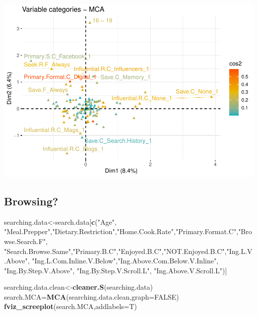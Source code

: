\documentclass[
]{article}
\newenvironment{Shaded}{\begin{snugshade}}{\end{snugshade}}
\newcommand{\DataTypeTok}[1]{\textcolor[rgb]{0.13,0.29,0.53}{#1}}
\newcommand{\KeywordTok}[1]{\textcolor[rgb]{0.13,0.29,0.53}{\textbf{#1}}}
\newcommand{\NormalTok}[1]{#1}
\newcommand{\OtherTok}[1]{\textcolor[rgb]{0.56,0.35,0.01}{#1}}
\newcommand{\StringTok}[1]{\textcolor[rgb]{0.31,0.60,0.02}{#1}}
\begin{document}
\includegraphics{Average-User-MCA_files/figure-latex/mca searching all-3.pdf}

\hypertarget{browsing}{%
\subsection{Browsing?}\label{browsing}}

\begin{Shaded}
\begin{Highlighting}[]
\NormalTok{searching.data<-search.data[}\KeywordTok{c}\NormalTok{(}\StringTok{"Age"}\NormalTok{, }\StringTok{"Meal.Prepper"}\NormalTok{,}\StringTok{"Dietary.Restriction"}\NormalTok{,}\StringTok{"Home.Cook.Rate"}\NormalTok{,}\StringTok{"Primary.Format.C"}\NormalTok{,}\StringTok{"Browse.Search.F"}\NormalTok{,}
            \StringTok{"Search.Browse.Same"}\NormalTok{,}\StringTok{"Primary.B.C"}\NormalTok{,}\StringTok{"Enjoyed.B.C"}\NormalTok{,}\StringTok{"NOT.Enjoyed.B.C"}\NormalTok{,}\StringTok{"Ing.L.V.Above"}\NormalTok{,}
            \StringTok{"Ing.L.Com.Inline.V.Below"}\NormalTok{,}\StringTok{"Ing.Above.Com.Below.V.Inline"}\NormalTok{,  }\StringTok{"Ing.By.Step.V.Above"}\NormalTok{,  }\StringTok{"Ing.By.Step.V.Scroll.L"}\NormalTok{,}
            \StringTok{"Ing.Above.V.Scroll.L"}\NormalTok{)]}

\NormalTok{searching.data.clean<-}\KeywordTok{cleaner.S}\NormalTok{(searching.data)}
\NormalTok{search.MCA=}\KeywordTok{MCA}\NormalTok{(searching.data.clean,}\DataTypeTok{graph=}\OtherTok{FALSE}\NormalTok{)}
\KeywordTok{fviz_screeplot}\NormalTok{(search.MCA,}\DataTypeTok{addlabels=}\NormalTok{T)}
\end{Highlighting}
\end{Shaded}
\end{document}
